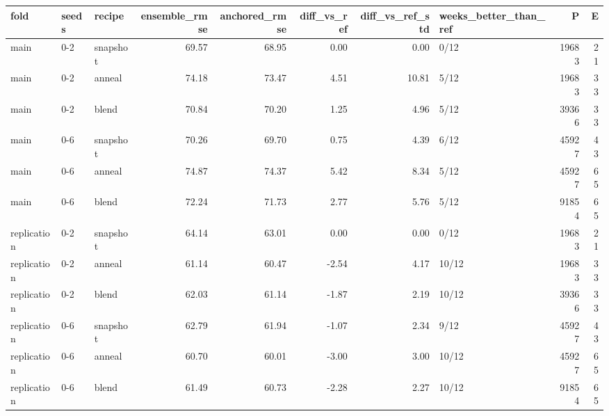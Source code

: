 \begin{tabular}{lllrrrrlrr}
\toprule
fold & seeds & recipe & ensemble\_rmse & anchored\_rmse & diff\_vs\_ref & diff\_vs\_ref\_std & weeks\_better\_than\_ref & P & E \\
\midrule
main & 0-2 & snapshot & 69.57 & 68.95 & 0.00 & 0.00 & 0/12 & 19683 & 21 \\
main & 0-2 & anneal & 74.18 & 73.47 & 4.51 & 10.81 & 5/12 & 19683 & 33 \\
main & 0-2 & blend & 70.84 & 70.20 & 1.25 & 4.96 & 5/12 & 39366 & 33 \\
main & 0-6 & snapshot & 70.26 & 69.70 & 0.75 & 4.39 & 6/12 & 45927 & 43 \\
main & 0-6 & anneal & 74.87 & 74.37 & 5.42 & 8.34 & 5/12 & 45927 & 65 \\
main & 0-6 & blend & 72.24 & 71.73 & 2.77 & 5.76 & 5/12 & 91854 & 65 \\
replication & 0-2 & snapshot & 64.14 & 63.01 & 0.00 & 0.00 & 0/12 & 19683 & 21 \\
replication & 0-2 & anneal & 61.14 & 60.47 & -2.54 & 4.17 & 10/12 & 19683 & 33 \\
replication & 0-2 & blend & 62.03 & 61.14 & -1.87 & 2.19 & 10/12 & 39366 & 33 \\
replication & 0-6 & snapshot & 62.79 & 61.94 & -1.07 & 2.34 & 9/12 & 45927 & 43 \\
replication & 0-6 & anneal & 60.70 & 60.01 & -3.00 & 3.00 & 10/12 & 45927 & 65 \\
replication & 0-6 & blend & 61.49 & 60.73 & -2.28 & 2.27 & 10/12 & 91854 & 65 \\
\bottomrule
\end{tabular}
